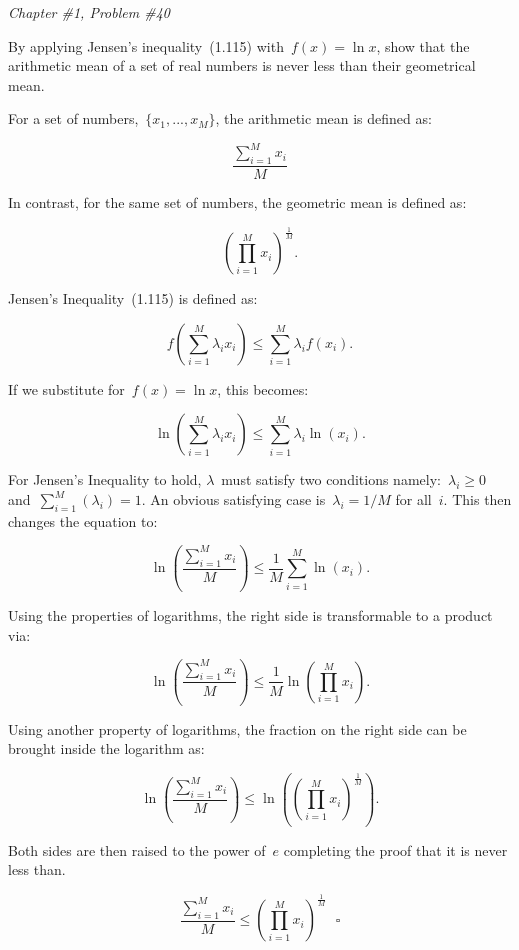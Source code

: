 \documentclass{report}
\newcounter{subProbCount}       %
\newenvironment{problemshell}{
  \par%
  \medskip
  \leftskip=0pt\rightskip=0pt%
}
{
  \par\medskip
  \setcounter{subProbCount}{1} %
}
\newenvironment{problem}[2]
{%
  \begin{problemshell}
    \noindent \textit{Chapter \##1, Problem \##2} \\
    \bfseries  
}
{
  \end{problemshell}
}
\begin{document}
  \newpage
  \begin{problem}{1}{40}
     By applying Jensen's inequality~(1.115) with~$f(x)=\ln x$, show that the arithmetic mean of a set of real numbers is never less than their geometrical mean.
  \end{problem}
  
  For a set of numbers,~$\{x_1,...,x_M\}$, the arithmetic mean is defined as:
  
  \[ \frac{\sum_{i=1}^{M}x_i}{M} \]
  
  In contrast, for the same set of numbers, the geometric mean is defined as:
  
  \[ \left( \prod_{i=1}^{M}x_i \right)^\frac{1}{M}\textrm{.} \]
  
  Jensen's Inequality~(1.115) is defined as:
  
  \[ f \left( \sum_{i=1}^M{\lambda_{i} x_i} \right) \leq \sum_{i=1}^M{\lambda_{i} f(x_i)}\textrm{.}\]
  
  If we substitute for~$f(x)=\ln x$, this becomes:

  \[ \ln \left( \sum_{i=1}^M{\lambda_{i} x_i} \right) \leq \sum_{i=1}^M{\lambda_{i} \ln(x_i)}\textrm{.} \]
  
  For Jensen's Inequality to hold, $\lambda$~must satisfy two conditions namely:~$\lambda_i \geq 0$ and~$\sum_{i=1}^{M}\left( \lambda_i \right) = 1$.  An obvious satisfying case is~$\lambda_i=1/M$ for all~$i$.  This then changes the equation to:
  
  \[ \ln \left( \frac{\sum_{i=1}^{M}{x_i}}{M} \right) \leq \frac{1}{M}\sum_{i=1}^M{\ln(x_i)}\textrm{.} \]
  
  Using the properties of logarithms, the right side is transformable to a product via:
  
  \[ \ln \left( \frac{\sum_{i=1}^{M}{x_i}}{M} \right) \leq \frac{1}{M}{\ln \left( \prod_{i=1}^M{x_i} \right)}\textrm{.} \]
  
  Using another property of logarithms, the fraction on the right side can be brought inside the logarithm as:
  
  \[ \ln \left( \frac{\sum_{i=1}^{M}{x_i}}{M} \right) \leq \ln \left( \left( \prod_{i=1}^M{x_i}\right)^\frac{1}{M} \right) \textrm{.} \]
  
  Both sides are then raised to the power of~$e$ completing the proof that it is never less than.
  
  \[ \frac{\sum_{i=1}^{M}{x_i}}{M} \leq \left( \prod_{i=1}^M{x_i}\right)^\frac{1}{M}  ~~~\square \]
\end{document}
